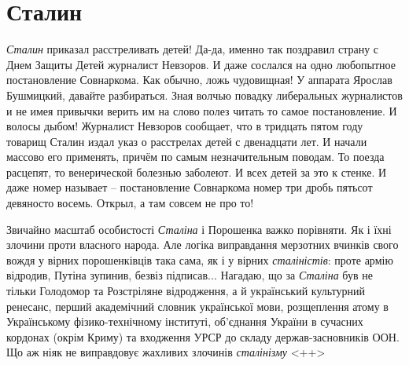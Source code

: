  
 
 
 
 
\chapter{Сталин}

\emph{Сталин} приказал расстреливать детей! Да-да, именно так поздравил страну с Днем
Защиты Детей журналист Невзоров. И даже сослался на одно любопытное
постановление Совнаркома. Как обычно, ложь чудовищная!  У аппарата Ярослав
Бушмицкий, давайте разбираться. Зная волчью повадку либеральных журналистов и
не имея привычки верить им на слово полез читать то самое постановление. И
волосы дыбом!  Журналист Невзоров сообщает, что в тридцать пятом году товарищ
Сталин издал указ о расстрелах детей с двенадцати лет. И начали массово его
применять, причём по самым незначительным поводам. То поезда расцепят, то
венерической болезнью заболеют. И всех детей за это к стенке. И даже номер
называет – постановление Совнаркома номер три дробь пятьсот девяносто восемь.
Открыл, а там совсем не про то!

Звичайно масштаб особистості \emph{Сталіна} і Порошенка важко порівняти. Як і їхні
злочини проти власного народа. Але логіка виправдання мерзотних вчинків свого
вождя у вірних порошенківців така сама, як і у вірних \emph{сталіністів}: проте армію
відродив, Путіна зупинив, безвіз підписав... Нагадаю, що за \emph{Сталіна} був не
тільки Голодомор та Розстріляне відродження, а й український культурний
ренесанс, перший академічний словник української мови, розщеплення атому в
Українському фізико-технічному інституті, об'єднання України в сучасних
кордонах (окрім Криму) та входження УРСР до складу держав-засновників ООН. Що
аж ніяк не виправдовує жахливих злочинів \emph{сталінізму}
  <++>
